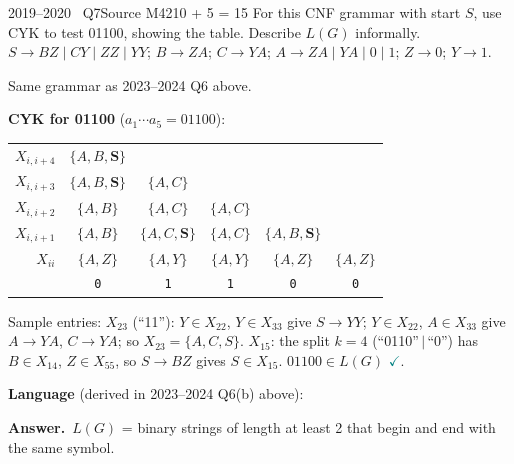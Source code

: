 \documentclass[11pt,a4paper]{article}
\newcommand{\ok}{\textcolor{teal}{\ensuremath{\checkmark}}}
\newcommand{\ans}[1]{\par\smallskip\noindent\colorbox{mist}{\parbox{\dimexpr\linewidth-2\fboxsep}{\sffamily\small\textbf{\color{teal}Answer.}\ \color{ink}#1}}\par}
\begin{document}
\begin{question}{2019--2020 \textbullet\ Q7}{Source M42}{10 + 5 = 15}
For this CNF grammar with start $S$, use CYK to test 01100, showing the table. Describe $L(G)$ informally.
$S\to BZ\mid CY\mid ZZ\mid YY$; $B\to ZA$; $C\to YA$; $A\to ZA\mid YA\mid0\mid1$; $Z\to0$; $Y\to1$.
\end{question}
\begin{solution}
Same grammar as 2023--2024 Q6 above.

\textbf{CYK for 01100} ($a_1\cdots a_5=01100$):
\begin{center}\small\renewcommand{\arraystretch}{1.25}\begin{tabular}{r|ccccc}\toprule
$X_{i,i+4}$ & $\{A,B,\mathbf{S}\}$ &  &  &  & \\
$X_{i,i+3}$ & $\{A,B,\mathbf{S}\}$ & $\{A,C\}$ &  &  & \\
$X_{i,i+2}$ & $\{A,B\}$ & $\{A,C\}$ & $\{A,C\}$ &  & \\
$X_{i,i+1}$ & $\{A,B\}$ & $\{A,C,\mathbf{S}\}$ & $\{A,C\}$ & $\{A,B,\mathbf{S}\}$ & \\
$X_{ii}$ & $\{A,Z\}$ & $\{A,Y\}$ & $\{A,Y\}$ & $\{A,Z\}$ & $\{A,Z\}$\\
\midrule & \texttt{0} & \texttt{1} & \texttt{1} & \texttt{0} & \texttt{0}\\\bottomrule\end{tabular}\end{center}
Sample entries: $X_{23}$ (``11''): $Y\in X_{22}$, $Y\in X_{33}$ give $S\to YY$; $Y\in X_{22}$, $A\in X_{33}$ give $A\to YA$, $C\to YA$; so $X_{23}=\{A,C,S\}$. $X_{15}$: the split $k=4$ (``0110''$\,|\,$``0'') has $B\in X_{14}$, $Z\in X_{55}$, so $S\to BZ$ gives $S\in X_{15}$. \textbf{$01100\in L(G)$} \ok.

\textbf{Language} (derived in 2023--2024 Q6(b) above): \ans{$L(G)$ = binary strings of length at least 2 that begin and end with the same symbol.}
\end{solution}
\end{document}
